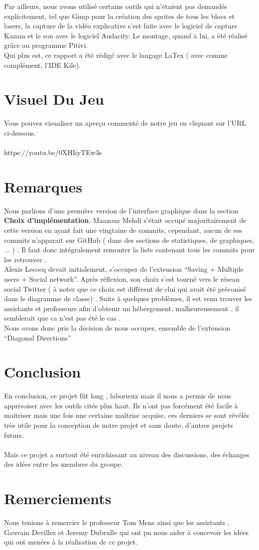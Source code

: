 \documentclass[a4paper,10pt]{article}
\begin{document}
Par ailleurs, nous avons utilisé certains outils qui n'étaient pas demandés explicitement, tel que Gimp pour la création des sprites de tous les blocs et lasers,
la capture de la vidéo explicative s'est faite avec le logiciel de capture Kazam et le son avec le logiciel Audacity. Le montage,
quand à lui, a été réalisé grâce au programme Pitivi.\\
Qui plus est, ce rapport a été rédigé avec le langage LaTex ( avec comme complément, l'IDE Kile).
\section{Visuel Du Jeu}
Vous pouvez visualiser un aperçu commenté de notre jeu en cliquant sur l'URL ci-dessous.
\\
\\
https://youtu.be/0XHIiyTEw3s


\section{Remarques}
Nous parlions d'une première version de l'interface graphique dans la section \textbf{Choix d'implémentation}, Maazouz Mehdi s'était occupé majoritairement
de cette version en ayant fait une vingtaine de commits, cependant, aucun de ses commits n'apparait sur GitHub ( dans des sections de statistiques, 
de graphiques, ... ) . Il faut donc intégralement remonter la liste contenant tous les commits pour les retrouver .\\


Alexis Lecocq devait initialement, s'occuper de l'extension ``Saving + Multiple users + Social network''. Après réflexion, son choix
s'est tourné vers le réseau social Twitter ( à noter que ce choix est différent de clui qui avait été préconisé dans le diagramme de classe)
. Suite à quelques problèmes, il est venu trouver les assistants et professeurs afin d'obtenir un hébergement,
malheureusement , il semblerait que ca n'est pas été le cas .\\
Nous avons donc pris la décision de nous occuper, ensemble de l'extension ``Diagonal Directions''
\section{Conclusion}
En conclusion, ce projet fût long , laborieux mais il nous a permis de nous apprivoiser avec les outils cités plus haut. Ils n'ont pas
forcément été facile à maitriser mais une fois une certaine maîtrise acquise, ces derniers se sont révélés très utile pour la conception de 
notre projet et sans doute, d'autres projets futurs. 
\\
\\
Mais ce projet a surtout été enrichissant au niveau des discussions, des échanges des idées entre les membres du groupe.

\section{Remerciements}
Nous tenions à remercier le professeur Tom Mens ainsi que les assistants , Gauvain Devillez et Jeremy Dubrulle qui ont pu nous aider à concevoir les idées qui ont menées 
à la réalisation de ce projet.
\end{document}
